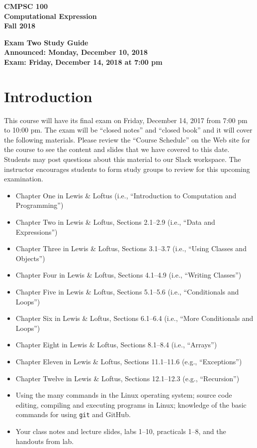\documentclass[11pt]{article}
\newcommand{\assignmentduedate}{December 14}
\newcommand{\assignmentassignedate}{December 10}
\newcommand{\assignmentnumber}{Two}
\newcommand{\labyear}{2018}
\newcommand{\assignedday}{Monday}
\newcommand{\dueday}{Friday}
\newcommand{\labtime}{7:00 pm}
\newcommand{\assigneddate}{Announced: \assignedday, \assignmentassignedate, \labyear{}}
\newcommand{\duedate}{Exam: \dueday, \assignmentduedate, \labyear{} at \labtime{}}
\newcommand{\guidetitle}[1]
{
  \begin{center}
    \begin{center}
      \bf
      CMPSC 100\\Computational Expression\\
      Fall 2018\\
      \medskip
    \end{center}
    \bf
    #1
  \end{center}
}
\begin{document}
\guidetitle{Exam \assignmentnumber{} Study Guide \\ \assigneddate{} \\ \duedate{}}

\section*{Introduction}

This course will have its final exam on Friday, \assignmentduedate{}, 2017 from
7:00 pm to 10:00 pm. The exam will be ``closed notes'' and ``closed book'' and
it will cover the following materials. Please review the ``Course Schedule'' on
the Web site for the course to see the content and slides that we have covered
to this date. Students may post questions about this material to our Slack
workspace. The instructor encourages students to form study groups to review for
this upcoming examination.

\begin{itemize}

  \itemsep 0in

  \item Chapter One in Lewis \& Loftus (i.e., ``Introduction to Computation and Programming'')

  \item Chapter Two in Lewis \& Loftus, Sections 2.1--2.9 (i.e., ``Data and Expressions'')

  \item Chapter Three in Lewis \& Loftus, Sections 3.1--3.7 (i.e., ``Using Classes and Objects'')

  \item Chapter Four in Lewis \& Loftus, Sections 4.1--4.9 (i.e., ``Writing Classes'')

  \item Chapter Five in Lewis \& Loftus, Sections 5.1--5.6 (i.e., ``Conditionals and Loops'')

  \item Chapter Six in Lewis \& Loftus, Sections 6.1--6.4 (i.e., ``More Conditionals and Loops'')

  \item Chapter Eight in Lewis \& Loftus, Sections 8.1--8.4 (i.e., ``Arrays'')

  \item Chapter Eleven in Lewis \& Loftus, Sections 11.1--11.6 (e.g., ``Exceptions'')

  \item Chapter Twelve in Lewis \& Loftus, Sections 12.1--12.3 (e.g., ``Recursion'')

  \item Using the many commands in the Linux operating system; source code
    editing, compiling and executing programs in Linux; knowledge of the basic
    commands for using {\tt git} and GitHub.


  \item Your class notes and lecture slides, labs 1--10, practicals 1--8, and the handouts from lab.

\end{itemize}
\end{document}

